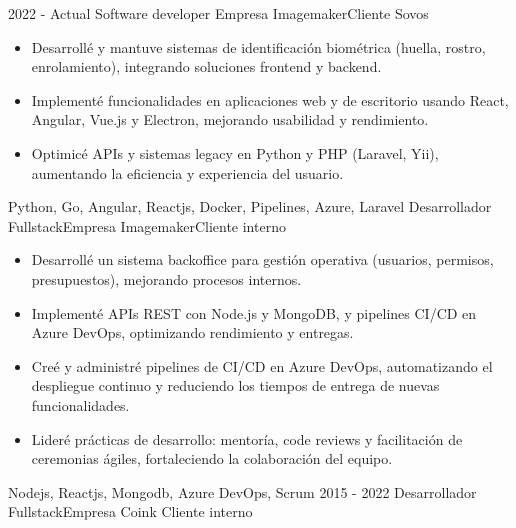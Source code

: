 %
%
%
\begin{experiences}
  \experience
    {2022 - Actual}  {Software developer} {Empresa Imagemaker}{Cliente Sovos}
    {} {
        \begin{itemize}
          \item Desarrollé y mantuve sistemas de identificación biométrica (huella, rostro, enrolamiento), integrando soluciones frontend y backend. 
          \item Implementé funcionalidades en aplicaciones web y de escritorio usando React, Angular, Vue.js y Electron, mejorando usabilidad y rendimiento.
          \item Optimicé APIs y sistemas legacy en Python y PHP (Laravel, Yii), aumentando la eficiencia y experiencia del usuario.
        \end{itemize}
       }
       { Python, Go, Angular, Reactjs, Docker, Pipelines, Azure, Laravel}
  \emptySeparator
  \experience
    {}   {Desarrollador Fullstack}{Empresa Imagemaker}{Cliente interno}
    {} {
        \begin{itemize}
          \item Desarrollé un sistema backoffice para gestión operativa (usuarios, permisos, presupuestos), mejorando procesos internos.
          \item Implementé APIs REST con Node.js y MongoDB, y pipelines CI/CD en Azure DevOps, optimizando rendimiento y entregas.
          \item Creé y administré pipelines de CI/CD en Azure DevOps, automatizando el despliegue continuo y reduciendo los tiempos de entrega de nuevas funcionalidades.
          \item Lideré prácticas de desarrollo: mentoría, code reviews y facilitación de ceremonias ágiles, fortaleciendo la colaboración del equipo.
        \end{itemize}
       }
       { Nodejs, Reactjs, Mongodb, Azure DevOps, Scrum }
  \emptySeparator  
  \experience
    {2015 - 2022} {Desarrollador Fullstack}{Empresa Coink} {Cliente interno}
    {}    {

}
\end{experiences}

